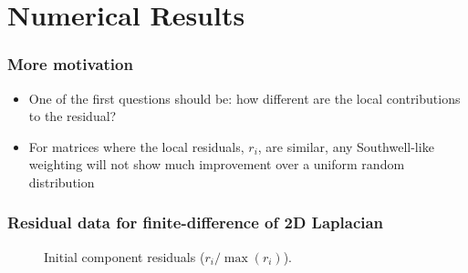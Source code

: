 \documentclass{beamer}
\begin{document}
\section{Numerical Results}

\begin{frame}
	\frametitle{More motivation}
	\begin{itemize}
		\item One of the first questions should be: how different are the local contributions to the residual?
		\item For matrices where the local residuals, $r_i$, are similar, any Southwell-like weighting will not show much improvement over a uniform random distribution
	\end{itemize}
\end{frame}

\begin{frame}
	\frametitle{Residual data for finite-difference of 2D Laplacian}
	\begin{figure}[H]
		\centering
		\caption{Initial component residuals ($r_i / \max (r_i)$).}
		\label{fig:initial-residuals-laplacian}
	\end{figure}
\end{frame}
\end{document}
